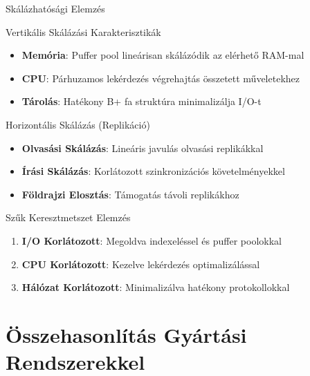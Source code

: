 \documentclass[aspectratio=169]{beamer}
\begin{document}
\begin{frame}{Skálázhatósági Elemzés}
\begin{block}{Vertikális Skálázási Karakterisztikák}
\begin{itemize}
    \item \textbf{Memória}: Puffer pool lineárisan skálázódik az elérhető RAM-mal
    \item \textbf{CPU}: Párhuzamos lekérdezés végrehajtás összetett műveletekhez
    \item \textbf{Tárolás}: Hatékony B+ fa struktúra minimalizálja I/O-t
\end{itemize}
\end{block}

\begin{block}{Horizontális Skálázás (Replikáció)}
\begin{itemize}
    \item \textbf{Olvasási Skálázás}: Lineáris javulás olvasási replikákkal
    \item \textbf{Írási Skálázás}: Korlátozott szinkronizációs követelményekkel
    \item \textbf{Földrajzi Elosztás}: Támogatás távoli replikákhoz
\end{itemize}
\end{block}

\begin{block}{Szűk Keresztmetszet Elemzés}
\begin{enumerate}
    \item \textbf{I/O Korlátozott}: Megoldva indexeléssel és puffer poolokkal
    \item \textbf{CPU Korlátozott}: Kezelve lekérdezés optimalizálással
    \item \textbf{Hálózat Korlátozott}: Minimalizálva hatékony protokollokkal
\end{enumerate}
\end{block}
\end{frame}

\section{Összehasonlítás Gyártási Rendszerekkel}
\end{document}
